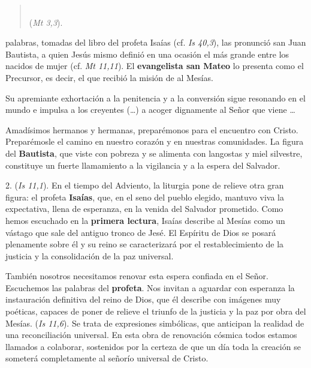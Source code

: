\begin{body}
	\begin{quote}
		 \\(\emph{Mt 3,3}).
	\end{quote}  
	
	 palabras, tomadas del libro del profeta Isaías (cf. \emph{Is 40,3}), las pronunció san Juan Bautista, a quien Jesús mismo definió en una ocasión el más grande entre los nacidos de mujer (cf. \emph{Mt 11,11}). El \textbf{evangelista san Mateo} lo presenta como el Precursor, es decir, el que recibió la misión de  al Mesías. 
	
	Su apremiante exhortación a la penitencia y a la conversión sigue resonando en el mundo e impulsa a los creyentes (\ldots{}) a acoger dignamente al Señor que viene \ldots{} 
	
	Amadísimos hermanos y hermanas, preparémonos para el encuentro con Cristo. Preparémosle el camino en nuestro corazón y en nuestras comunidades. La figura del \textbf{Bautista}, que viste con pobreza y se alimenta con langostas y miel silvestre, constituye un fuerte llamamiento a la vigilancia y a la espera del Salvador. 
	
	2.  (\emph{Is 11,1}). En el tiempo del Adviento, la liturgia pone de relieve otra gran figura: el profeta \textbf{Isaías}, que, en el seno del pueblo elegido, mantuvo viva la expectativa, llena de esperanza, en la venida del Salvador prometido. Como hemos escuchado en la \textbf{primera lectura}, Isaías describe al Mesías como un vástago que sale del antiguo tronco de Jesé. El Espíritu de Dios se posará plenamente sobre él y su reino se caracterizará por el restablecimiento de la justicia y la consolidación de la paz universal. 
	
	También nosotros necesitamos renovar esta espera confiada en el Señor. Escuchemos las palabras del \textbf{profeta}. Nos invitan a aguardar con esperanza la instauración definitiva del reino de Dios, que él describe con imágenes muy poéticas, capaces de poner de relieve el triunfo de la justicia y la paz por obra del Mesías.  (\emph{Is 11,6}). Se trata de expresiones simbólicas, que anticipan la realidad de una reconciliación universal. En esta obra de renovación cósmica todos estamos llamados a colaborar, sostenidos por la certeza de que un día toda la creación se someterá completamente al señorío universal de Cristo. 
	

\end{body}
